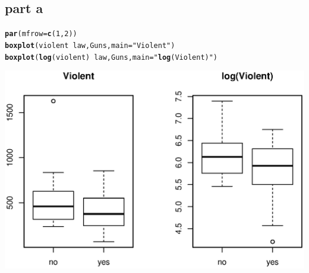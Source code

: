 \documentclass{article}\usepackage{graphicx, color}
\makeatletter
\newcommand{\hlfunctioncall}[1]{\textcolor[rgb]{0.501960784313725,0,0.329411764705882}{\textbf{#1}}}%
\newcommand{\hlstring}[1]{\textcolor[rgb]{0.6,0.6,1}{#1}}%
\newenvironment{kframe}{%
 \def\at@end@of@kframe{}%
 \ifinner\ifhmode%
  \def\at@end@of@kframe{\end{minipage}}%
  \begin{minipage}{\columnwidth}%
 \fi\fi%
 \def\FrameCommand##1{\hskip\@totalleftmargin \hskip-\fboxsep
 \colorbox{shadecolor}{##1}\hskip-\fboxsep
     \hskip-\linewidth \hskip-\@totalleftmargin \hskip\columnwidth}%
 \MakeFramed {\advance\hsize-\width
   \@totalleftmargin\z@ \linewidth\hsize
   \@setminipage}}%
 {\par\unskip\endMakeFramed%
 \at@end@of@kframe}
\newenvironment{knitrout}{}{} %
\makeatother
\begin{document}
\subsection*{part a}
\begin{knitrout}
\color{fgcolor}\begin{kframe}
\begin{alltt}
\hlfunctioncall{par}(mfrow=\hlfunctioncall{c}(1,2))
\hlfunctioncall{boxplot}(violent~law, Guns,main=\hlstring{"Violent"})
\hlfunctioncall{boxplot}(\hlfunctioncall{log}(violent)~law, Guns,main=\hlstring{"\hlfunctioncall{log}(Violent)"})
\end{alltt}
\end{kframe}

{\centering \includegraphics[width=\linewidth]{plots/unnamed-chunk-14} 

}


\end{knitrout}
\end{document}
